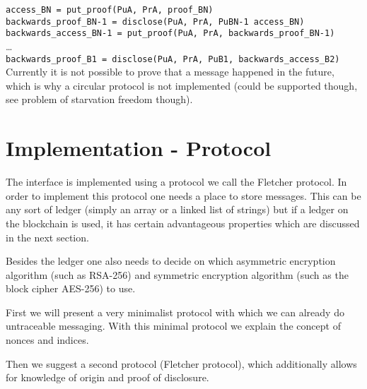 \documentclass[a4paper]{article} %
\begin{document}
\lstinline{access_BN = put_proof(PuA, PrA, proof_BN)}\\
\lstinline{backwards_proof_BN-1 = disclose(PuA, PrA, PuBN-1 access_BN)}\\
\lstinline{backwards_access_BN-1 = put_proof(PuA, PrA, backwards_proof_BN-1)}\\
\ldots\\
\lstinline{backwards_proof_B1 = disclose(PuA, PrA, PuB1, backwards_access_B2)}\\

Currently it is not possible to prove that a message happened in the future, which is why a circular protocol is not implemented (could be supported though, see problem of starvation freedom though).
\newpage

\section{Implementation - Protocol}
The interface is implemented using a protocol we call the Fletcher protocol. In order to implement this protocol one needs a place to store messages. This can be any sort of ledger (simply an array or a linked list of strings) but if a ledger on the blockchain is used, it has certain advantageous properties which are discussed in the next section.

Besides the ledger one also needs to decide on which asymmetric encryption algorithm (such as RSA-256) and symmetric encryption algorithm (such as the block cipher AES-256) to use.

First we will present a very minimalist protocol with which we can already do untraceable messaging. With this minimal protocol we explain the concept of nonces and indices.

Then we suggest a second protocol (Fletcher protocol), which additionally allows for knowledge of origin and proof of disclosure. 
\end{document}

